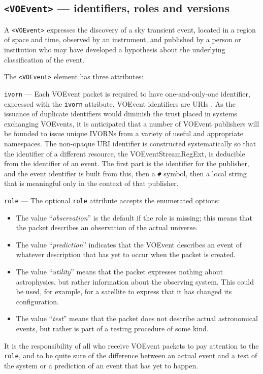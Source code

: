 \documentclass[11pt,a4paper]{ivoa}
\begin{document}
\subsection{{\tt <VOEvent>} --- identifiers, roles and versions}
\label{sec:3.1}
A {\tt <VOEvent>} expresses the discovery of a sky transient event, located in a
region of space and time, observed by an instrument, and published by a person 
or institution who may have developed a hypothesis about the underlying 
classification of the event. 

The {\tt <VOEvent>} element has three attributes:  

 {\tt ivorn} \label{sec:3.1.1} ---
Each VOEvent packet is required to have one-and-only-one identifier, expressed 
with the {\tt ivorn} attribute. VOEvent identifiers are URIs 
\citep{2016ivoa.spec.0523D}. As the issuance of duplicate identifiers would 
diminish the trust placed in systems exchanging VOEvents, it is anticipated that 
a number of VOEvent publishers will be founded to issue unique IVORNs from a 
variety of useful and appropriate namespaces. The non-opaque URI identifier is 
constructed systematically so that the identifier of a different resource, the 
VOEventStreamRegExt, is deducible from the identifier of an event. The first 
part is the identifier for the publisher, and the event identifier is built 
from this, then a {\tt\#} symbol, then a local string that is meaningful only 
in the context of that publisher.

 {\tt role} \label{sec:3.1.2} ---
The optional {\tt role} attribute accepts the enumerated options:
\begin{itemize}
\item The value ``\emph{observation}'' is the default if the role is missing; 
this means that the packet describes an observation of the actual universe. 
\item The value ``\emph{prediction}'' indicates that the VOEvent describes an 
event of whatever description that has yet to occur when the packet is created. 
\item The value ``\emph{utility}'' means that the packet expresses nothing about
astrophysics, but rather information about the observing system. This could be 
used, for example, for a satellite to express that it has changed its 
configuration. 
\item The value ``\emph{test}'' means that the packet does not describe actual 
astronomical events, but rather is part of a testing procedure of some kind.
\end{itemize}
It is the responsibility of all who receive VOEvent packets to pay attention to 
the {\tt role}, and to be quite sure of the difference between an actual event 
and a test of the system or a prediction of an event that has yet to happen. 
\end{document}

